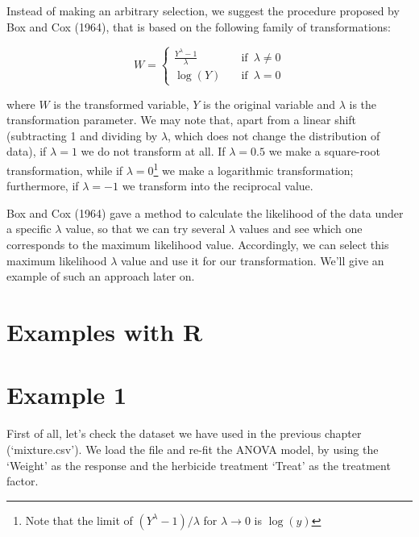 \documentclass[a4paper,12pt,oneside]{book}
\begin{document}
Instead of making an arbitrary selection, we suggest the procedure proposed by Box and Cox (1964), that is based on the following family of transformations:

\[ W = \left\{ \begin{array}{ll}
\frac{Y^\lambda -1}{\lambda} & \quad \textrm{if} \,\,\, \lambda \neq 0 \\
\log(Y) & \quad \textrm{if} \,\,\, \lambda = 0
\end{array} \right.\]

where \(W\) is the transformed variable, \(Y\) is the original variable and \(\lambda\) is the transformation parameter. We may note that, apart from a linear shift (subtracting 1 and dividing by \(\lambda\), which does not change the distribution of data), if \(\lambda = 1\) we do not transform at all. If \(\lambda = 0.5\) we make a square-root transformation, while if \(\lambda = 0\)\footnote{Note that the limit of \((Y^\lambda -1)/\lambda\) for \(\lambda \rightarrow 0\) is \(\log(y)\)} we make a logarithmic transformation; furthermore, if \(\lambda = -1\) we transform into the reciprocal value.

Box and Cox (1964) gave a method to calculate the likelihood of the data under a specific \(\lambda\) value, so that we can try several \(\lambda\) values and see which one corresponds to the maximum likelihood value. Accordingly, we can select this maximum likelihood \(\lambda\) value and use it for our transformation. We'll give an example of such an approach later on.

\hypertarget{examples-with-r}{%
\section{Examples with R}\label{examples-with-r}}

\hypertarget{example-1}{%
\section{Example 1}\label{example-1}}

First of all, let's check the dataset we have used in the previous chapter (`mixture.csv'). We load the file and re-fit the ANOVA model, by using the `Weight' as the response and the herbicide treatment `Treat' as the treatment factor.
\end{document}
